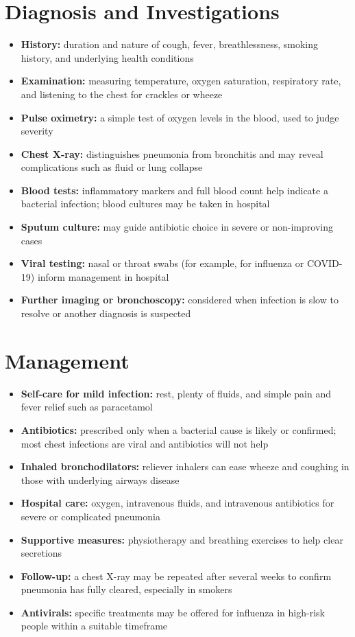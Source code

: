 \section*{Diagnosis and Investigations}
\begin{itemize}
    \item \textbf{History:} duration and nature of cough, fever, breathlessness, smoking history, and underlying health conditions
    \item \textbf{Examination:} measuring temperature, oxygen saturation, respiratory rate, and listening to the chest for crackles or wheeze
    \item \textbf{Pulse oximetry:} a simple test of oxygen levels in the blood, used to judge severity
    \item \textbf{Chest X-ray:} distinguishes pneumonia from bronchitis and may reveal complications such as fluid or lung collapse
    \item \textbf{Blood tests:} inflammatory markers and full blood count help indicate a bacterial infection; blood cultures may be taken in hospital
    \item \textbf{Sputum culture:} may guide antibiotic choice in severe or non-improving cases
    \item \textbf{Viral testing:} nasal or throat swabs (for example, for influenza or COVID-19) inform management in hospital
    \item \textbf{Further imaging or bronchoscopy:} considered when infection is slow to resolve or another diagnosis is suspected
\end{itemize}

\section*{Management}
\begin{itemize}
    \item \textbf{Self-care for mild infection:} rest, plenty of fluids, and simple pain and fever relief such as paracetamol
    \item \textbf{Antibiotics:} prescribed only when a bacterial cause is likely or confirmed; most chest infections are viral and antibiotics will not help
    \item \textbf{Inhaled bronchodilators:} reliever inhalers can ease wheeze and coughing in those with underlying airways disease
    \item \textbf{Hospital care:} oxygen, intravenous fluids, and intravenous antibiotics for severe or complicated pneumonia
    \item \textbf{Supportive measures:} physiotherapy and breathing exercises to help clear secretions
    \item \textbf{Follow-up:} a chest X-ray may be repeated after several weeks to confirm pneumonia has fully cleared, especially in smokers
    \item \textbf{Antivirals:} specific treatments may be offered for influenza in high-risk people within a suitable timeframe
\end{itemize}


